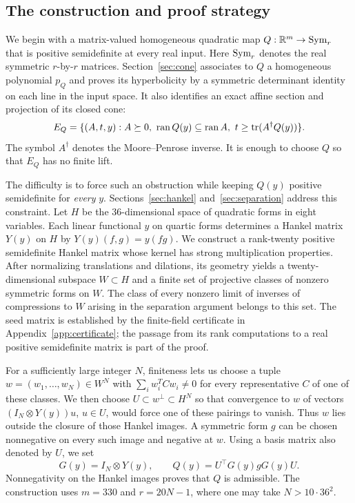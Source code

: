 \subsection{The construction and proof strategy}

We begin with a matrix-valued homogeneous quadratic map
$Q:\mathbb R^m\to\operatorname{Sym}_r$ that is positive semidefinite at every real input.
Here $\operatorname{Sym}_r$ denotes the real symmetric $r$-by-$r$ matrices.
Section~\ref{sec:cone} associates to $Q$ a homogeneous polynomial
$p_Q$ and proves its hyperbolicity by a symmetric determinant identity
on each line in the input space. It also identifies an exact affine
section and projection of its closed cone:
\[
 E_Q=\{(A,t,y): A\succeq0,\ \operatorname{ran} Q(y)\subseteq\operatorname{ran} A,
                    \ t\ge\operatorname{tr}(A^\dagger Q(y))\}.
\]
The symbol $A^\dagger$ denotes the Moore--Penrose inverse. It is enough
to choose $Q$ so that $E_Q$ has no finite lift.

The difficulty is to force such an obstruction while keeping $Q(y)$
positive semidefinite for \emph{every} $y$. Sections~\ref{sec:hankel}
and~\ref{sec:separation} address this constraint. Let $H$ be the
36-dimensional space of quadratic forms in eight variables. Each
linear functional $y$ on quartic forms determines a Hankel matrix
$Y(y)$ on $H$ by $Y(y)(f,g)=y(fg)$. We construct a rank-twenty
positive semidefinite Hankel matrix whose kernel has strong
multiplication properties. After normalizing translations and dilations,
its geometry yields a twenty-dimensional subspace $W\subset H$ and a
finite set of projective classes of nonzero symmetric forms on $W$.
The class of every nonzero limit of inverses of compressions to $W$
arising in the separation argument belongs to this set. The seed matrix
is established by the finite-field certificate in
Appendix~\ref{app:certificate}; the passage from its rank computations
to a real positive semidefinite matrix is part of the proof.

For a sufficiently large integer $N$, finiteness lets us choose a tuple
$w=(w_1,\ldots,w_N)\in W^N$ with $\sum_i w_i^TCw_i\ne0$ for every
representative $C$ of one of these classes. We then choose
$U\subset w^\perp\subset H^N$ so that convergence to $w$ of vectors
$(I_N\otimes Y(y))u$, $u\in U$, would force one of these pairings
to vanish. Thus $w$ lies outside the closure of those Hankel images.
A symmetric form $g$ can be chosen nonnegative on every such image
and negative at $w$. Using a basis matrix also denoted by $U$, we set
\[
 G(y)=I_N\otimes Y(y),\qquad Q(y)=U^\top G(y)gG(y)U.
\]
Nonnegativity on the Hankel images proves that $Q$ is admissible.
The construction uses $m=330$ and $r=20N-1$, where one may take
$N>10\cdot36^2$.


